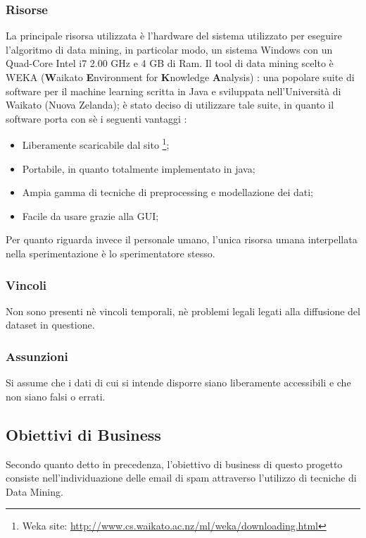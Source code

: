 \subsubsection{Risorse}
La principale risorsa utilizzata è l'hardware del sistema utilizzato per eseguire l'algoritmo di data mining, in particolar modo, un sistema Windows con un Quad-Core Intel i7 2.00 GHz e 4 GB di Ram.
Il tool di data mining scelto è WEKA (\textbf{W}aikato \textbf{E}nvironment for \textbf{K}nowledge \textbf{A}nalysis) \cite{WEKA}:
una popolare suite di software per il machine learning scritta in Java e sviluppata nell'Università di Waikato (Nuova Zelanda); è stato deciso di utilizzare tale suite, in quanto il software porta con sè i seguenti vantaggi :
\begin{itemize}
	\item Liberamente scaricabile dal sito \footnote{Weka site: \url{http://www.cs.waikato.ac.nz/ml/weka/downloading.html}};
    \item Portabile, in quanto totalmente implementato in java;
    \item Ampia gamma di tecniche di preprocessing e modellazione dei dati;
    \item Facile da usare grazie alla GUI;
\end{itemize}

Per quanto riguarda invece il personale umano, l'unica risorsa umana interpellata nella sperimentazione è lo sperimentatore stesso.

\subsubsection{Vincoli}
	Non sono presenti nè vincoli temporali, nè problemi legali legati alla diffusione del dataset in questione.

\subsubsection{Assunzioni}
	Si assume che i dati di cui si intende disporre siano liberamente accessibili e che non siano falsi o errati.

\subsection{Obiettivi di Business}
	Secondo quanto detto in precedenza, l'obiettivo di business di questo progetto consiste nell'individuazione delle email di spam attraverso l'utilizzo di tecniche di Data Mining.

